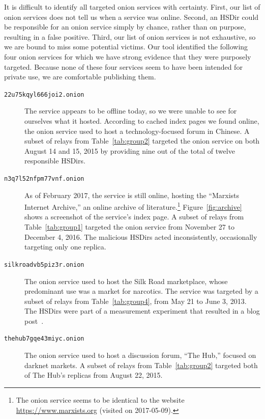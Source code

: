 It is difficult to identify all targeted onion services with certainty.  First,
our list of onion services does not tell us when a service was online.  Second,
an HSDir could be responsible for an onion service simply by chance, rather than 
on purpose, resulting in a false positive.  Third, our list of onion services is
not exhaustive, so we are bound to miss some potential victims.  Our tool
identified the following four onion services for which we have strong evidence
that they were purposely targeted.  Because none of these four services seem to
have been intended for private use, we are comfortable publishing them.

\begin{description}
	\item[\texttt{22u75kqyl666joi2.onion}] The service appears to be offline
		today, so we were unable to see for ourselves what it hosted.  According
		to cached index pages we found online, the onion service used to host a
		technology-focused forum in Chinese.  A subset of relays from
		Table~\ref{tab:group2} targeted the onion service on both August 14 and
		15, 2015 by providing nine out of the total of twelve responsible
		HSDirs.

	\item[\texttt{n3q7l52nfpm77vnf.onion}] As of February 2017, the service is
		still online, hosting the ``Marxists Internet Archive,'' an online
		archive of literature.\footnote{The onion service seems to be identical
		to the website \url{https://www.marxists.org} (visited on 2017-05-09).}
		Figure~\ref{fig:archive} shows a screenshot of the service's index page.
		A subset of relays from Table~\ref{tab:group1} targeted the onion
		service from November 27 to December 4, 2016.  The malicious HSDirs
		acted inconsistently, occasionally targeting only one replica.

	\item[\texttt{silkroadvb5piz3r.onion}] The onion service used to host the
		Silk Road marketplace, whose predominant use was a market for narcotics.
		The service was targeted by a subset of relays from
		Table~\ref{tab:group4}, from May 21 to June 3, 2013.  The HSDirs were
		part of a measurement experiment that resulted in a blog
		post~\cite{OCearbhaill2013a}.

	\item[\texttt{thehub7gqe43miyc.onion}] The onion service used to host a
		discussion forum, ``The Hub,'' focused on darknet markets.  A subset of
		relays from Table~\ref{tab:group2} targeted both of The Hub's replicas
		from August 22, 2015.
\end{description}


